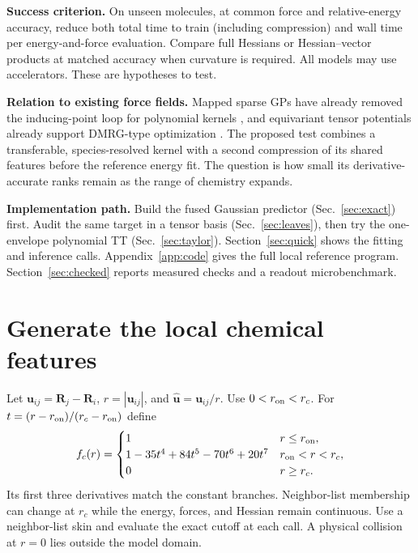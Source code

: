 \documentclass[11pt,a4paper]{article}
\begin{document}
\textbf{Success criterion.} On unseen molecules, at common force and relative-energy accuracy, reduce both total time to train (including compression) and wall time per energy-and-force evaluation. Compare full Hessians or Hessian--vector products at matched accuracy when curvature is required. All models may use accelerators. These are hypotheses to test.

\textbf{Relation to existing force fields.} Mapped sparse GPs have already removed the inducing-point loop for polynomial kernels \cite{flare}, and equivariant tensor potentials already support DMRG-type optimization \cite{etn}. The proposed test combines a transferable, species-resolved kernel with a second compression of its shared features before the reference energy fit. The question is how small its derivative-accurate ranks remain as the range of chemistry expands.

\textbf{Implementation path.} Build the fused Gaussian predictor (Sec.~\ref{sec:exact}) first. Audit the same target in a tensor basis (Sec.~\ref{sec:leaves}), then try the one-envelope polynomial TT (Sec.~\ref{sec:taylor}). Section~\ref{sec:quick} shows the fitting and inference calls. Appendix~\ref{app:code} gives the full local reference program. Section~\ref{sec:checked} reports measured checks and a readout microbenchmark.
\pg\begingroup\small\setlength{\parskip}{0pt}\tableofcontents\endgroup
\pg\section{Generate the local chemical features}
Let $\mathbf u_{ij}=\mathbf R_j-\mathbf R_i$, $r=|\mathbf u_{ij}|$, and $\hat{\mathbf u}=\mathbf u_{ij}/r$. Use $0<r_{\rm on}<r_c$. For $t=(r-r_{\rm on})/(r_c-r_{\rm on})$ define
\begin{equation}
 f_c(r)=
 \begin{cases}1&r\le r_{\rm on},\\
 1-35t^4+84t^5-70t^6+20t^7&r_{\rm on}<r<r_c,\\
 0&r\ge r_c .
 \end{cases}\label{eq:cut}
\end{equation}
Its first three derivatives match the constant branches. Neighbor-list membership can change at $r_c$ while the energy, forces, and Hessian remain continuous. Use a neighbor-list skin and evaluate the exact cutoff at each call. A physical collision at $r=0$ lies outside the model domain.
\end{document}
